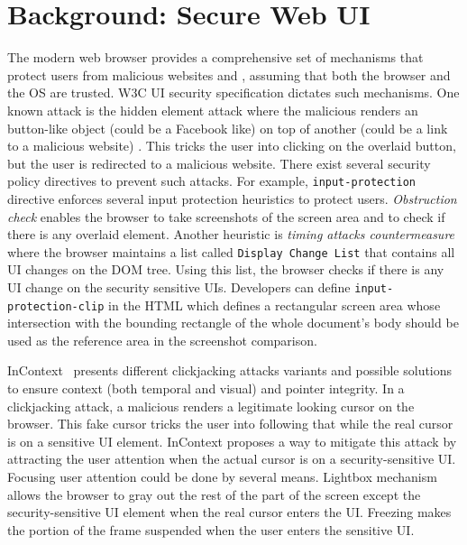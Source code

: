 \section{Background: Secure Web UI}
\label{sec:background}

The modern web browser provides a comprehensive set of mechanisms that protect users from malicious websites and \js, assuming that both the browser and the OS are trusted. W3C UI security specification \cite{w3c_spec} dictates such mechanisms. One known attack is the hidden element attack where the malicious \js renders an button-like object (could be a Facebook like) on top of another (could be a link to a malicious website) . This tricks the user into clicking on the overlaid button, but the user is redirected to a malicious website. There exist several security policy directives to prevent such attacks. For example, \texttt{input-protection} directive enforces several input protection heuristics to protect users. \emph{Obstruction check} enables the browser to take screenshots of the screen area and to check if there is any overlaid element. Another heuristic is \emph{timing attacks countermeasure} where the browser maintains a list called \texttt{Display Change List} that contains all UI changes on the DOM tree. Using this list, the browser checks if there is any UI change on the security sensitive UIs. Developers can define \texttt{input-protection-clip} in the HTML which defines a rectangular screen area whose intersection with the bounding rectangle of the whole document's body should be used as the reference area in the screenshot comparison.

InContext~\cite{huang2012clickjacking} presents different clickjacking attacks variants and possible solutions to ensure context (both temporal and visual) and pointer integrity. In a clickjacking attack, a malicious \js renders a legitimate looking cursor on the browser. This fake cursor tricks the user into following that while the real cursor is on a sensitive UI element. InContext proposes a way to mitigate this attack by attracting the user attention when the actual cursor is on a security-sensitive UI. Focusing user attention could be done by several means. Lightbox mechanism allows the browser to gray out the rest of the part of the screen except the security-sensitive UI element when the real cursor enters the UI. Freezing makes the portion of the frame suspended when the user enters the sensitive UI. %